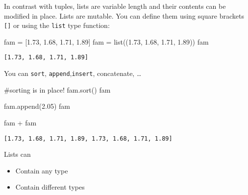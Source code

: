 \documentclass[
  letterpaper,
  DIV=11,
  numbers=noendperiod]{scrreprt}
\newenvironment{Shaded}{\begin{snugshade}}{\end{snugshade}}
\newcommand{\BuiltInTok}[1]{\textcolor[rgb]{0.00,0.23,0.31}{#1}}
\newcommand{\CommentTok}[1]{\textcolor[rgb]{0.37,0.37,0.37}{#1}}
\newcommand{\FloatTok}[1]{\textcolor[rgb]{0.68,0.00,0.00}{#1}}
\newcommand{\NormalTok}[1]{\textcolor[rgb]{0.00,0.23,0.31}{#1}}
\newcommand{\OperatorTok}[1]{\textcolor[rgb]{0.37,0.37,0.37}{#1}}
\providecommand{\tightlist}{%
  \setlength{\itemsep}{0pt}\setlength{\parskip}{0pt}}\usepackage{longtable,booktabs,array}
\begin{document}
In contrast with tuples, lists are variable length and their contents
can be modified in place. Lists are mutable. You can define them using
square brackets \texttt{{[}{]}} or using the \texttt{list} type
function:

\begin{Shaded}
\begin{Highlighting}[]
\NormalTok{fam }\OperatorTok{=}\NormalTok{ [}\FloatTok{1.73}\NormalTok{, }\FloatTok{1.68}\NormalTok{, }\FloatTok{1.71}\NormalTok{, }\FloatTok{1.89}\NormalTok{]}
\NormalTok{fam }\OperatorTok{=} \BuiltInTok{list}\NormalTok{((}\FloatTok{1.73}\NormalTok{, }\FloatTok{1.68}\NormalTok{, }\FloatTok{1.71}\NormalTok{, }\FloatTok{1.89}\NormalTok{))}
\NormalTok{fam}
\end{Highlighting}
\end{Shaded}

\begin{verbatim}
[1.73, 1.68, 1.71, 1.89]
\end{verbatim}

You can \texttt{sort}, \texttt{append},\texttt{insert}, concatenate,
\ldots{}

\begin{Shaded}
\begin{Highlighting}[]
\CommentTok{\#sorting is in place!}
\NormalTok{fam.sort()}
\NormalTok{fam}
\end{Highlighting}
\end{Shaded}

\begin{Shaded}
\begin{Highlighting}[]
\NormalTok{fam.append(}\FloatTok{2.05}\NormalTok{)}
\NormalTok{fam}
\end{Highlighting}
\end{Shaded}

\begin{Shaded}
\begin{Highlighting}[]
\NormalTok{fam }\OperatorTok{+}\NormalTok{ fam}
\end{Highlighting}
\end{Shaded}

\begin{verbatim}
[1.73, 1.68, 1.71, 1.89, 1.73, 1.68, 1.71, 1.89]
\end{verbatim}

Lists can

\begin{itemize}
\tightlist
\item
  Contain any type
\item
  Contain different types
\end{itemize}
\end{document}
